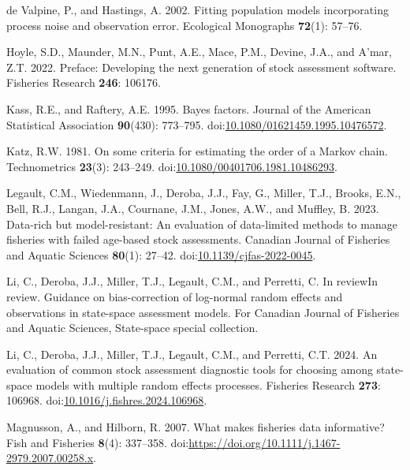 \documentclass[
  12pt,
]{article}
\newlength{\cslhangindent}
\newlength{\cslentryspacingunit} %
\newenvironment{CSLReferences}[2] %
 {%
  \setlength{\parindent}{0pt}
  \ifodd #1
  \let\oldpar\par
  \def\par{\hangindent=\cslhangindent\oldpar}
  \fi
  \setlength{\parskip}{#2\cslentryspacingunit}
 }%
 {}
\begin{document}
\begin{CSLReferences}{1}{0}
\leavevmode{}%
de Valpine, P., and Hastings, A. 2002. Fitting population models
incorporating process noise and observation error. Ecological Monographs
\textbf{72}(1): 57--76.

\leavevmode{}%
Hoyle, S.D., Maunder, M.N., Punt, A.E., Mace, P.M., Devine, J.A., and
A'mar, Z.T. 2022. Preface: Developing the next generation of stock
assessment software. Fisheries Research \textbf{246}: 106176.

\leavevmode{}%
Kass, R.E., and Raftery, A.E. 1995. Bayes factors. Journal of the
American Statistical Association \textbf{90}(430): 773--795.
doi:\href{https://doi.org/10.1080/01621459.1995.10476572}{10.1080/01621459.1995.10476572}.

\leavevmode{}%
Katz, R.W. 1981. On some criteria for estimating the order of a {M}arkov
chain. Technometrics \textbf{23}(3): 243--249.
doi:\href{https://doi.org/10.1080/00401706.1981.10486293}{10.1080/00401706.1981.10486293}.

\leavevmode{}%
Legault, C.M., Wiedenmann, J., Deroba, J.J., Fay, G., Miller, T.J.,
Brooks, E.N., Bell, R.J., Langan, J.A., Cournane, J.M., Jones, A.W., and
Muffley, B. 2023. Data-rich but model-resistant: An evaluation of
data-limited methods to manage fisheries with failed age-based stock
assessments. Canadian Journal of Fisheries and Aquatic Sciences
\textbf{80}(1): 27--42.
doi:\href{https://doi.org/10.1139/cjfas-2022-0045}{10.1139/cjfas-2022-0045}.

\leavevmode{}%
Li, C., Deroba, J.J., Miller, T.J., Legault, C.M., and Perretti, C. In
reviewIn review. Guidance on bias-correction of log-normal random
effects and observations in state-space assessment models. For Canadian
Journal of Fisheries and Aquatic Sciences, State-space special
collection.

\leavevmode{}%
Li, C., Deroba, J.J., Miller, T.J., Legault, C.M., and Perretti, C.T.
2024. An evaluation of common stock assessment diagnostic tools for
choosing among state-space models with multiple random effects
processes. Fisheries Research \textbf{273}: 106968.
doi:\href{https://doi.org/10.1016/j.fishres.2024.106968}{10.1016/j.fishres.2024.106968}.

\leavevmode{}%
Magnusson, A., and Hilborn, R. 2007. What makes fisheries data
informative? Fish and Fisheries \textbf{8}(4): 337--358.
doi:\url{https://doi.org/10.1111/j.1467-2979.2007.00258.x}.


\end{CSLReferences}
\end{document}
